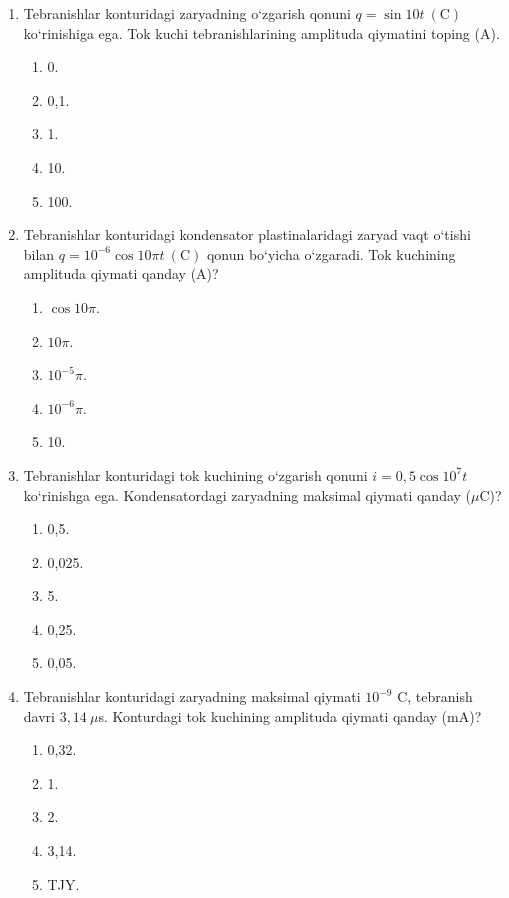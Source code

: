 \begin{enumerate}
\begin{tikzpicture}[thick, scale=0.5]
\end{tikzpicture}

\begin{enumerate}[label=\Alph*)]
\item 1.
\item 2.
\item 3.
\item 4.
\item hammasida.
\end{enumerate}

\item Tebranishlar konturidagi zaryadning o‘zgarish qonuni $q=\sin 10t \ (\text{C})$ ko‘rinishiga ega. Tok kuchi tebranishlarining amplituda qiymatini toping (A).
\begin{enumerate}[label=\Alph*)]
\item 0.
\item 0,1.
\item 1.
\item 10.
\item 100.
\end{enumerate}

\item Tebranishlar konturidagi kondensator plastinalaridagi zaryad vaqt o‘tishi bilan $q=10^{-6}\cos10\pi t \ (\text{C})$ qonun bo‘yicha o‘zgaradi. Tok kuchining amplituda qiymati qanday (A)?
\begin{enumerate}[label=\Alph*)]
\item $\cos10\pi$.
\item $10\pi$.
\item $10^{-5}\pi$.
\item $10^{-6}\pi$.
\item 10.
\end{enumerate}

\item Tebranishlar konturidagi tok kuchining o‘zgarish qonuni $i=0,5\cos10^7 t$ ko‘rinishga ega. Kondensatordagi zaryadning maksimal qiymati qanday ($\mu$C)?
\begin{enumerate}[label=\Alph*)]
\item 0,5.
\item 0,025.
\item 5.
\item 0,25.
\item 0,05.
\end{enumerate}

\item Tebranishlar konturidagi zaryadning maksimal qiymati $10^{-9}$ C, tebranish davri $3,14~\mu$s. Konturdagi tok kuchining amplituda qiymati qanday (mA)?
\begin{enumerate}[label=\Alph*)]
\item 0,32.
\item 1.
\item 2.
\item 3,14.
\item TJY.
\end{enumerate}


\end{enumerate}
